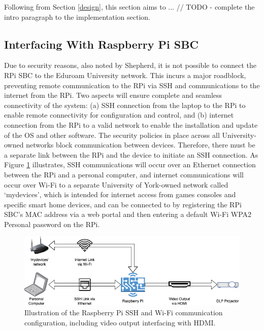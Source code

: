 Following from Section \ref{design}, this section aims to ... // TODO - complete the intro paragraph to the implementation section.

\subsection{Interfacing With Raspberry Pi SBC}

Due to security reasons, also noted by Shepherd, it is not possible to connect the RPi SBC to the Eduroam University network. This incurs a major roadblock, preventing remote communication to the RPi via SSH and communications to the internet from the RPi. Two aspects will ensure complete and seamless connectivity of the system: (a) SSH connection from the laptop to the RPi to enable remote connectivity for configuration and control, and (b) internet connection from the RPi to a valid network to enable the installation and update of the OS and other software. The security policies in place across all University-owned networks block communication between devices. Therefore, there must be a separate link between the RPi and the device to initiate an SSH connection. As Figure \ref{fig:pi_interfacing} illustrates, SSH communications will occur over an Ethernet connection between the RPi and a personal computer, and internet communications will occur over Wi-Fi to a separate University of York-owned network called `mydevices', which is intended for internet access from games consoles and specific smart home devices, and can be connected to by registering the RPi SBC's MAC address via a web portal and then entering a default Wi-Fi WPA2 Personal password on the RPi.

\begin{figure}[H]
    \centering
    \includegraphics[width=1\textwidth]{assets/interface_diagram.png}
    \caption{Illustration of the Raspberry Pi SSH and Wi-Fi communication configuration, including video output interfacing with HDMI.}
    \label{fig:pi_interfacing}
\end{figure}

